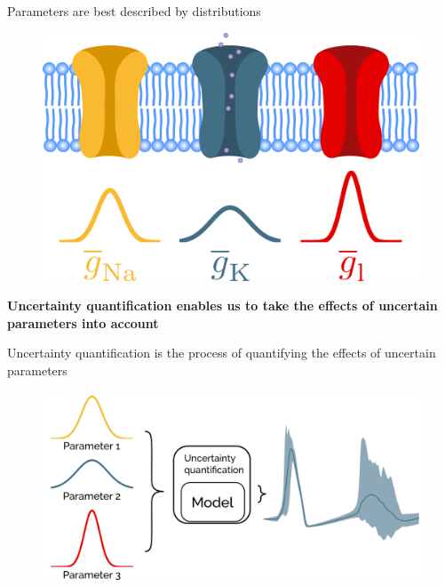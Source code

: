 \documentclass[presentation]{beamer}
\begin{document}




\begin{frame}{Parameters are best described by distributions}
  \begin{figure}
    \includegraphics[width=1\textwidth]{distribution_channels.png}
  \end{figure}

\end{frame}



\begin{frame}
  \textbf{\Large{\color{myred}
  Uncertainty quantification} enables us to take the effects of
  uncertain parameters into account}

\end{frame}






\begin{frame}{Uncertainty quantification is the process of quantifying the effects of
              uncertain parameters}
  \begin{figure}
    \includegraphics[width=1\textwidth]{probabalistic.png}
  \end{figure}

\end{frame}
\end{document}
